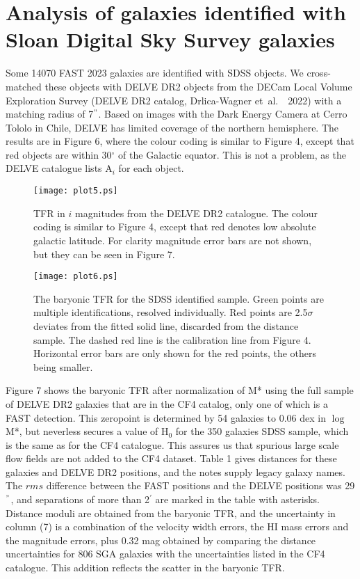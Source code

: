 \documentclass{article}
\newcommand{\etal}{\mbox{\rm{et al.}~~}}
\begin{document}
\section{Analysis of galaxies identified with Sloan Digital Sky Survey galaxies}
Some 14070 FAST 2023 galaxies are identified with SDSS objects. We cross-matched these objects with DELVE DR2 objects 
from the DECam Local Volume Exploration Survey (DELVE DR2 catalog,
Drlica-Wagner \etal 2022)
with a matching radius of 7$^"$. Based on images with the Dark Energy Camera at Cerro Tololo in Chile, DELVE has limited coverage of the northern hemisphere. The results are in Figure 6, where the colour coding is similar to Figure 4, except that red objects are within 30$^\circ$ of the Galactic equator.
This is not a problem, as the DELVE catalogue lists A$_i$ for each object.
\begin{figure}	
\texttt{[image: plot5.ps]}
\caption{TFR in $i$ magnitudes from the DELVE DR2 catalogue. The colour coding is similar to Figure 4, except that red denotes low absolute galactic latitude. For clarity magnitude error bars are not shown, but they can be seen in Figure 7.}
\end{figure}
\begin{figure}	
\texttt{[image: plot6.ps]}
\caption{The baryonic TFR for the SDSS identified sample. Green points are multiple identifications, resolved individually. Red points are 2.5$\sigma$ deviates from the fitted solid line, discarded from the distance sample. The dashed red line is the calibration line from Figure 4. Horizontal error bars are only shown for the red points, the others being smaller.}
\end{figure}
Figure 7 shows the baryonic TFR after normalization of M* using the full sample of DELVE DR2 galaxies that are in the CF4 catalog, only one of which is a FAST detection. This zeropoint is determined by 54 galaxies to 0.06 dex in $\log$M*, but neverless secures a value of H$_0$ for the 350 galaxies SDSS sample, which is the same as for the CF4 catalogue. This assures us that spurious large scale flow fields are not added to the CF4 dataset. 
Table 1 gives distances for these galaxies and DELVE DR2 positions, and the notes supply legacy galaxy names. %
The $rms$ difference between the FAST positions and the DELVE positions was 29$^"$, and separations of more than 2$^\prime$ are marked in the table with asterisks. Distance moduli are obtained from the baryonic TFR, and the uncertainty in column (7) is a combination of the velocity width errors, the HI mass errors and the magnitude errors, plus 0.32 mag obtained by comparing the distance uncertainties for 806 SGA galaxies with the uncertainties listed in the CF4 catalogue. This addition reflects the scatter in the baryonic TFR.
\end{document}
